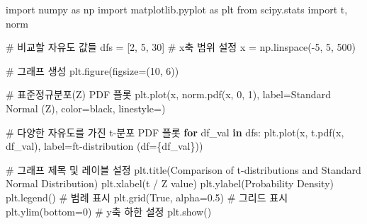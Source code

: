 \documentclass[
  letterpaper,
]{book}
\newenvironment{Shaded}{\begin{snugshade}}{\end{snugshade}}
\newcommand{\CommentTok}[1]{\textcolor[rgb]{0.37,0.37,0.37}{#1}}
\newcommand{\ControlFlowTok}[1]{\textcolor[rgb]{0.00,0.23,0.31}{\textbf{#1}}}
\newcommand{\DecValTok}[1]{\textcolor[rgb]{0.68,0.00,0.00}{#1}}
\newcommand{\FloatTok}[1]{\textcolor[rgb]{0.68,0.00,0.00}{#1}}
\newcommand{\ImportTok}[1]{\textcolor[rgb]{0.00,0.46,0.62}{#1}}
\newcommand{\KeywordTok}[1]{\textcolor[rgb]{0.00,0.23,0.31}{\textbf{#1}}}
\newcommand{\NormalTok}[1]{\textcolor[rgb]{0.00,0.23,0.31}{#1}}
\newcommand{\OperatorTok}[1]{\textcolor[rgb]{0.37,0.37,0.37}{#1}}
\newcommand{\SpecialCharTok}[1]{\textcolor[rgb]{0.37,0.37,0.37}{#1}}
\newcommand{\SpecialStringTok}[1]{\textcolor[rgb]{0.13,0.47,0.30}{#1}}
\newcommand{\StringTok}[1]{\textcolor[rgb]{0.13,0.47,0.30}{#1}}
\newcommand{\VariableTok}[1]{\textcolor[rgb]{0.07,0.07,0.07}{#1}}
\begin{document}
\begin{Shaded}
\begin{Highlighting}[]
\ImportTok{import}\NormalTok{ numpy }\ImportTok{as}\NormalTok{ np}
\ImportTok{import}\NormalTok{ matplotlib.pyplot }\ImportTok{as}\NormalTok{ plt}
\ImportTok{from}\NormalTok{ scipy.stats }\ImportTok{import}\NormalTok{ t, norm}

\CommentTok{\# 비교할 자유도 값들}
\NormalTok{dfs }\OperatorTok{=}\NormalTok{ [}\DecValTok{2}\NormalTok{, }\DecValTok{5}\NormalTok{, }\DecValTok{30}\NormalTok{]}
\CommentTok{\# x축 범위 설정}
\NormalTok{x }\OperatorTok{=}\NormalTok{ np.linspace(}\OperatorTok{{-}}\DecValTok{5}\NormalTok{, }\DecValTok{5}\NormalTok{, }\DecValTok{500}\NormalTok{)}

\CommentTok{\# 그래프 생성}
\NormalTok{plt.figure(figsize}\OperatorTok{=}\NormalTok{(}\DecValTok{10}\NormalTok{, }\DecValTok{6}\NormalTok{))}

\CommentTok{\# 표준정규분포(Z) PDF 플롯}
\NormalTok{plt.plot(x, norm.pdf(x, }\DecValTok{0}\NormalTok{, }\DecValTok{1}\NormalTok{), label}\OperatorTok{=}\StringTok{\textquotesingle{}Standard Normal (Z)\textquotesingle{}}\NormalTok{, color}\OperatorTok{=}\StringTok{\textquotesingle{}black\textquotesingle{}}\NormalTok{, linestyle}\OperatorTok{=}\StringTok{\textquotesingle{}{-}{-}\textquotesingle{}}\NormalTok{)}

\CommentTok{\# 다양한 자유도를 가진 t{-}분포 PDF 플롯}
\ControlFlowTok{for}\NormalTok{ df\_val }\KeywordTok{in}\NormalTok{ dfs:}
\NormalTok{    plt.plot(x, t.pdf(x, df\_val), label}\OperatorTok{=}\SpecialStringTok{f\textquotesingle{}t{-}distribution (df=}\SpecialCharTok{\{}\NormalTok{df\_val}\SpecialCharTok{\}}\SpecialStringTok{)\textquotesingle{}}\NormalTok{)}

\CommentTok{\# 그래프 제목 및 레이블 설정}
\NormalTok{plt.title(}\StringTok{\textquotesingle{}Comparison of t{-}distributions and Standard Normal Distribution\textquotesingle{}}\NormalTok{)}
\NormalTok{plt.xlabel(}\StringTok{\textquotesingle{}t / Z value\textquotesingle{}}\NormalTok{)}
\NormalTok{plt.ylabel(}\StringTok{\textquotesingle{}Probability Density\textquotesingle{}}\NormalTok{)}
\NormalTok{plt.legend() }\CommentTok{\# 범례 표시}
\NormalTok{plt.grid(}\VariableTok{True}\NormalTok{, alpha}\OperatorTok{=}\FloatTok{0.5}\NormalTok{) }\CommentTok{\# 그리드 표시}
\NormalTok{plt.ylim(bottom}\OperatorTok{=}\DecValTok{0}\NormalTok{) }\CommentTok{\# y축 하한 설정}
\NormalTok{plt.show()}
\end{Highlighting}
\end{Shaded}
\end{document}

